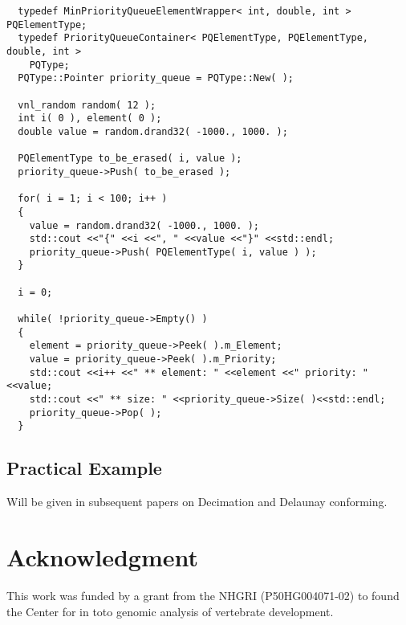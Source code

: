 \documentclass{InsightArticle}
\begin{document}
\begin{verbatim}
  typedef MinPriorityQueueElementWrapper< int, double, int > PQElementType;
  typedef PriorityQueueContainer< PQElementType, PQElementType, double, int >
    PQType;
  PQType::Pointer priority_queue = PQType::New( );

  vnl_random random( 12 );
  int i( 0 ), element( 0 );
  double value = random.drand32( -1000., 1000. );

  PQElementType to_be_erased( i, value );
  priority_queue->Push( to_be_erased );

  for( i = 1; i < 100; i++ )
  {
    value = random.drand32( -1000., 1000. );
    std::cout <<"{" <<i <<", " <<value <<"}" <<std::endl;
    priority_queue->Push( PQElementType( i, value ) );
  }

  i = 0;

  while( !priority_queue->Empty() )
  {
    element = priority_queue->Peek( ).m_Element;
    value = priority_queue->Peek( ).m_Priority;
    std::cout <<i++ <<" ** element: " <<element <<" priority: " <<value;
    std::cout <<" ** size: " <<priority_queue->Size( )<<std::endl;
    priority_queue->Pop( );
  }

\end{verbatim}

\subsection{Practical Example}
Will be given in subsequent papers on Decimation and Delaunay conforming.

\section{Acknowledgment}
This work was funded by a grant from the NHGRI (P50HG004071-02) to found the Center for in toto genomic analysis of vertebrate development.
%
%



\end{document}
